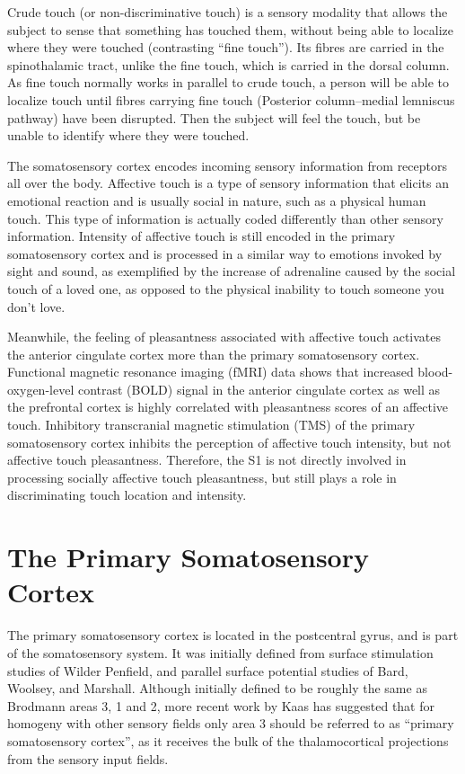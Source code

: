 Crude touch (or non-discriminative touch) is a sensory modality that allows the subject to sense that something has touched them, without being able to localize where they were touched (contrasting ``fine touch''). Its fibres are carried in the spinothalamic tract, unlike the fine touch, which is carried in the dorsal column. As fine touch normally works in parallel to crude touch, a person will be able to localize touch until fibres carrying fine touch (Posterior column--medial lemniscus pathway) have been disrupted. Then the subject will feel the touch, but be unable to identify where they were touched.

The somatosensory cortex encodes incoming sensory information from receptors all over the body. Affective touch is a type of sensory information that elicits an emotional reaction and is usually social in nature, such as a physical human touch. This type of information is actually coded differently than other sensory information. Intensity of affective touch is still encoded in the primary somatosensory cortex and is processed in a similar way to emotions invoked by sight and sound, as exemplified by the increase of adrenaline caused by the social touch of a loved one, as opposed to the physical inability to touch someone you don't love.

Meanwhile, the feeling of pleasantness associated with affective touch activates the anterior cingulate cortex more than the primary somatosensory cortex. Functional magnetic resonance imaging (fMRI) data shows that increased blood-oxygen-level contrast (BOLD) signal in the anterior cingulate cortex as well as the prefrontal cortex is highly correlated with pleasantness scores of an affective touch. Inhibitory transcranial magnetic stimulation (TMS) of the primary somatosensory cortex inhibits the perception of affective touch intensity, but not affective touch pleasantness. Therefore, the S1 is not directly involved in processing socially affective touch pleasantness, but still plays a role in discriminating touch location and intensity.

\hypertarget{the-primary-somatosensory-cortex}{%
\section{The Primary Somatosensory Cortex}\label{the-primary-somatosensory-cortex}}

The primary somatosensory cortex is located in the postcentral gyrus, and is part of the somatosensory system. It was initially defined from surface stimulation studies of Wilder Penfield, and parallel surface potential studies of Bard, Woolsey, and Marshall. Although initially defined to be roughly the same as Brodmann areas 3, 1 and 2, more recent work by Kaas has suggested that for homogeny with other sensory fields only area 3 should be referred to as ``primary somatosensory cortex'', as it receives the bulk of the thalamocortical projections from the sensory input fields.

